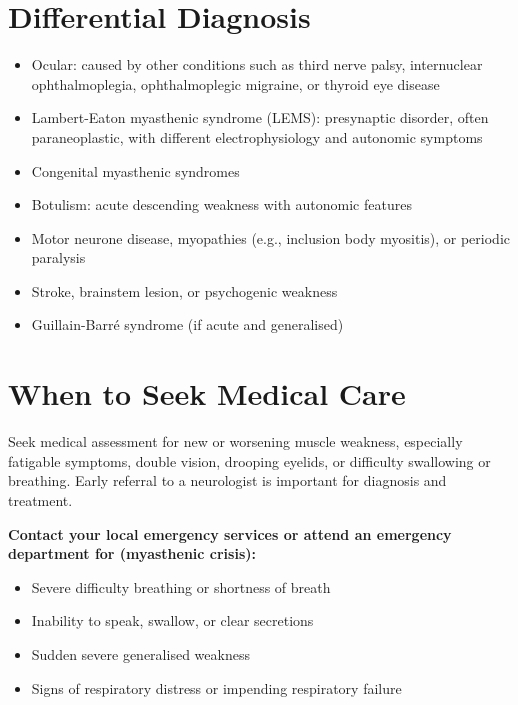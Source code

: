 \section*{Differential Diagnosis}
\begin{itemize}
    \item Ocular: caused by other conditions such as third nerve palsy, internuclear ophthalmoplegia, ophthalmoplegic migraine, or thyroid eye disease
    \item Lambert-Eaton myasthenic syndrome (LEMS): presynaptic disorder, often paraneoplastic, with different electrophysiology and autonomic symptoms
    \item Congenital myasthenic syndromes
    \item Botulism: acute descending weakness with autonomic features
    \item Motor neurone disease, myopathies (e.g., inclusion body myositis), or periodic paralysis
    \item Stroke, brainstem lesion, or psychogenic weakness
    \item Guillain-Barré syndrome (if acute and generalised)
\end{itemize}

\section*{When to Seek Medical Care}
Seek medical assessment for new or worsening muscle weakness, especially fatigable symptoms, double vision, drooping eyelids, or difficulty swallowing or breathing. Early referral to a neurologist is important for diagnosis and treatment.

\textbf{Contact your local emergency services or attend an emergency department for (myasthenic crisis):}
\begin{itemize}
    \item Severe difficulty breathing or shortness of breath
    \item Inability to speak, swallow, or clear secretions
    \item Sudden severe generalised weakness
    \item Signs of respiratory distress or impending respiratory failure
\end{itemize}


